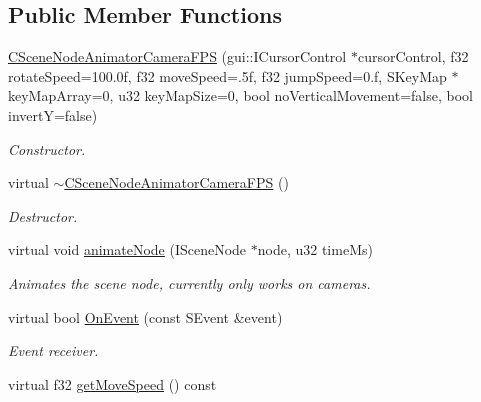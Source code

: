 \subsection*{Public Member Functions}
\begin{DoxyCompactItemize}
\item 
\hyperlink{classirr_1_1scene_1_1_c_scene_node_animator_camera_f_p_s_a9b1db47a2b725bcae9b7e9a6c7568ab4}{C\-Scene\-Node\-Animator\-Camera\-F\-P\-S} (gui\-::\-I\-Cursor\-Control $\ast$cursor\-Control, f32 rotate\-Speed=100.\-0f, f32 move\-Speed=.\-5f, f32 jump\-Speed=0.\-f, S\-Key\-Map $\ast$key\-Map\-Array=0, u32 key\-Map\-Size=0, bool no\-Vertical\-Movement=false, bool invert\-Y=false)
\begin{DoxyCompactList}\small\item\em Constructor. \end{DoxyCompactList}\item 
virtual \hyperlink{classirr_1_1scene_1_1_c_scene_node_animator_camera_f_p_s_af264f8294f6250565a48850c453d63da}{$\sim$\-C\-Scene\-Node\-Animator\-Camera\-F\-P\-S} ()
\begin{DoxyCompactList}\small\item\em Destructor. \end{DoxyCompactList}\item 
\hypertarget{classirr_1_1scene_1_1_c_scene_node_animator_camera_f_p_s_af0baa8ce5b5f291fc20d2efa7a2a03b9}{virtual void \hyperlink{classirr_1_1scene_1_1_c_scene_node_animator_camera_f_p_s_af0baa8ce5b5f291fc20d2efa7a2a03b9}{animate\-Node} (I\-Scene\-Node $\ast$node, u32 time\-Ms)}\label{classirr_1_1scene_1_1_c_scene_node_animator_camera_f_p_s_af0baa8ce5b5f291fc20d2efa7a2a03b9}

\begin{DoxyCompactList}\small\item\em Animates the scene node, currently only works on cameras. \end{DoxyCompactList}\item 
virtual bool \hyperlink{classirr_1_1scene_1_1_c_scene_node_animator_camera_f_p_s_a69701adc3db7e3c85cb4397507787c05}{On\-Event} (const S\-Event \&event)
\begin{DoxyCompactList}\small\item\em Event receiver. \end{DoxyCompactList}\item 
\hypertarget{classirr_1_1scene_1_1_c_scene_node_animator_camera_f_p_s_ab88654eda9e694f1d8edad0afb4f19a1}{virtual f32 \hyperlink{classirr_1_1scene_1_1_c_scene_node_animator_camera_f_p_s_ab88654eda9e694f1d8edad0afb4f19a1}{get\-Move\-Speed} () const }\label{classirr_1_1scene_1_1_c_scene_node_animator_camera_f_p_s_ab88654eda9e694f1d8edad0afb4f19a1}


\end{DoxyCompactItemize}
